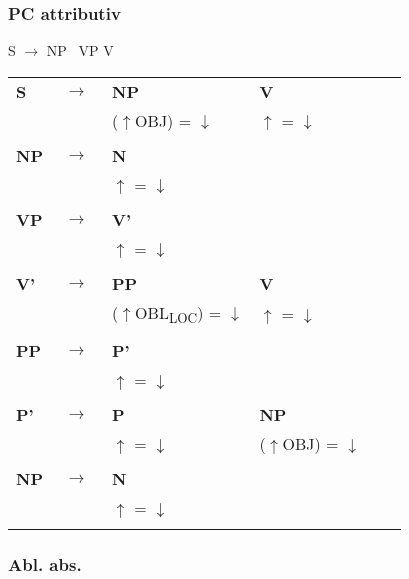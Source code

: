 \documentclass[12pt,a4paper]{article}
\begin{document}
\subsubsection{PC attributiv}

S $\rightarrow$ NP \, VP \: V\\

\begin{tabular}{ l  l  l  l  l  l }
  \textbf{S} & $\rightarrow$ & \: \: \textbf{NP} & \: \textbf{V}\\
   & $\qquad$ & ($\uparrow$OBJ) = $\downarrow$ & $\uparrow$ = $\downarrow$ \\
   $\qquad$ & $\qquad$ \\
    \textbf{NP} & $\rightarrow$ & \: \textbf{N} \\
   & $\qquad$ & $\uparrow$ = $\downarrow$\\
      $\qquad$ & $\qquad$ \\
    \textbf{VP} & $\rightarrow$ & \: \textbf{V'} \\
   & $\qquad$ & $\uparrow$ = $\downarrow$\\
   $\qquad$ & $\qquad$ \\
    \textbf{V'} & $\rightarrow$ & \: \: \textbf{PP} & \: \: \textbf{V} & \\
   & $\qquad$ &($\uparrow$OBL\textsubscript{LOC}) = $\downarrow$  & \: $\uparrow$ = $\downarrow$\\
   $\qquad$ & $\qquad$ \\
    \textbf{PP} & $\rightarrow$ & \: \textbf{P'} \\
	& $\qquad$   & $\uparrow$ = $\downarrow$\\
   $\qquad$ & $\qquad$ \\
    \textbf{P'} & $\rightarrow$ & \: \textbf{P} & \: \: \textbf{NP} \\
   & $\qquad$ & $\uparrow$ = $\downarrow$ & ($\uparrow$OBJ) = $\downarrow$ \\
   $\qquad$ & $\qquad$ \\
    \textbf{NP} & $\rightarrow$ & \: \textbf{N} \\
   & $\qquad$ & $\uparrow$ = $\downarrow$\\
      $\qquad$ & $\qquad$ \\     
\end{tabular} 

\subsubsection{Abl. abs.}
\end{document}
